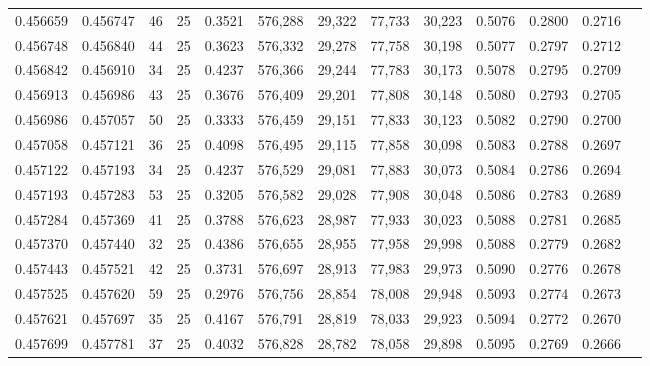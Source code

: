 \begin{tabular}{rrrrrrrrrrrrr}
0.456659 & 0.456747 &    46 &  25 &                                     0.3521 & 576,288 &  29,322 &  77,733 &  30,223 & 0.5076 & 0.2800 & 0.2716 \\
0.456748 & 0.456840 &    44 &  25 &                                     0.3623 & 576,332 &  29,278 &  77,758 &  30,198 & 0.5077 & 0.2797 & 0.2712 \\
0.456842 & 0.456910 &    34 &  25 &                                     0.4237 & 576,366 &  29,244 &  77,783 &  30,173 & 0.5078 & 0.2795 & 0.2709 \\
0.456913 & 0.456986 &    43 &  25 &                                     0.3676 & 576,409 &  29,201 &  77,808 &  30,148 & 0.5080 & 0.2793 & 0.2705 \\
0.456986 & 0.457057 &    50 &  25 &                                     0.3333 & 576,459 &  29,151 &  77,833 &  30,123 & 0.5082 & 0.2790 & 0.2700 \\
0.457058 & 0.457121 &    36 &  25 &                                     0.4098 & 576,495 &  29,115 &  77,858 &  30,098 & 0.5083 & 0.2788 & 0.2697 \\
0.457122 & 0.457193 &    34 &  25 &                                     0.4237 & 576,529 &  29,081 &  77,883 &  30,073 & 0.5084 & 0.2786 & 0.2694 \\
0.457193 & 0.457283 &    53 &  25 &                                     0.3205 & 576,582 &  29,028 &  77,908 &  30,048 & 0.5086 & 0.2783 & 0.2689 \\
0.457284 & 0.457369 &    41 &  25 &                                     0.3788 & 576,623 &  28,987 &  77,933 &  30,023 & 0.5088 & 0.2781 & 0.2685 \\
0.457370 & 0.457440 &    32 &  25 &                                     0.4386 & 576,655 &  28,955 &  77,958 &  29,998 & 0.5088 & 0.2779 & 0.2682 \\
0.457443 & 0.457521 &    42 &  25 &                                     0.3731 & 576,697 &  28,913 &  77,983 &  29,973 & 0.5090 & 0.2776 & 0.2678 \\
0.457525 & 0.457620 &    59 &  25 &                                     0.2976 & 576,756 &  28,854 &  78,008 &  29,948 & 0.5093 & 0.2774 & 0.2673 \\
0.457621 & 0.457697 &    35 &  25 &                                     0.4167 & 576,791 &  28,819 &  78,033 &  29,923 & 0.5094 & 0.2772 & 0.2670 \\
0.457699 & 0.457781 &    37 &  25 &                                     0.4032 & 576,828 &  28,782 &  78,058 &  29,898 & 0.5095 & 0.2769 & 0.2666 \\

\end{tabular}
